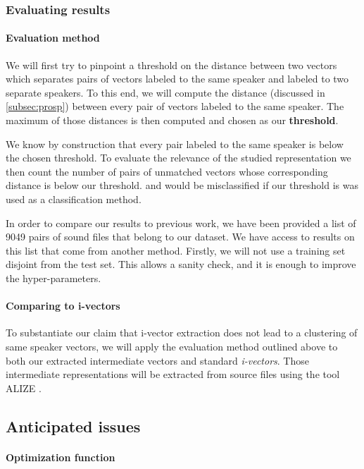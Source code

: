 \documentclass[conference]{IEEEtran}
\begin{document}
\subsubsection{Evaluating results}

\paragraph{Evaluation method}

We will first try to pinpoint a threshold on the distance
between two vectors which separates pairs of vectors labeled to the same speaker
and labeled to two separate speakers. To this end, we will compute the distance
(discussed in \ref{subsec:prosp}) between every pair of vectors labeled to the
same speaker. The maximum of those distances is then computed and chosen as our
\textbf{threshold}.

We know by construction that every pair labeled to the same speaker is below the
chosen threshold. To evaluate the relevance of the studied representation we
then count the number of pairs of unmatched vectors whose corresponding distance
is below our threshold. and would be misclassified if our threshold is was used
as a classification method.

In order to compare our results to previous work, we have been provided a list 
of 9049 pairs of sound files that belong to our dataset. We have access to results
on this list that come from another method. Firstly,  we will not use a training
set disjoint from the test set. This allows a sanity check, and it is enough to
improve the hyper-parameters.

\paragraph{Comparing to i-vectors}

 To substantiate our claim that i-vector extraction does not lead to a
 clustering of same speaker vectors, we will apply the evaluation method
 outlined above to both our
 extracted intermediate vectors and standard \emph{i-vectors}. Those
 intermediate representations will be extracted from source files using the tool
 ALIZE \cite{larcher2013alize}.

\subsection{Anticipated issues}

\paragraph{Optimization function}
\end{document}
